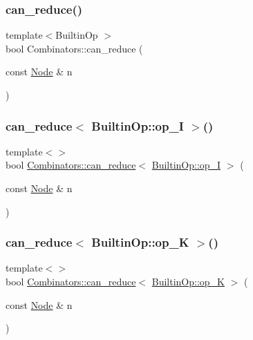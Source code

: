 \subsubsection{\texorpdfstring{can\+\_\+reduce()}{can\_reduce()}}
{\footnotesize\ttfamily template$<$Builtin\+Op $>$ \\
bool Combinators\+::can\+\_\+reduce (\begin{DoxyParamCaption}\item[{const \hyperlink{class_node}{Node} \&}]{n }\end{DoxyParamCaption})}

\mbox{\label{namespace_combinators_ad95b1d79317c4d84eb4f96bac4176fc5}} 
\subsubsection{\texorpdfstring{can\+\_\+reduce$<$ Builtin\+Op\+::op\+\_\+\+I $>$()}{can\_reduce< BuiltinOp::op\_I >()}}
{\footnotesize\ttfamily template$<$$>$ \\
bool \hyperlink{namespace_combinators_aa3c93f1edab6764d54dda56aafac9cd3}{Combinators\+::can\+\_\+reduce}$<$ \hyperlink{_instruction_8h_af2fb7c87c5854c5733d7bb0506b06de7ad44d28cb2a17778a81beb232dd72759a}{Builtin\+Op\+::op\+\_\+I} $>$ (\begin{DoxyParamCaption}\item[{const \hyperlink{class_node}{Node} \&}]{n }\end{DoxyParamCaption})}

\mbox{\label{namespace_combinators_acf147e40e9f56872bedc87bd63705672}} 
\subsubsection{\texorpdfstring{can\+\_\+reduce$<$ Builtin\+Op\+::op\+\_\+\+K $>$()}{can\_reduce< BuiltinOp::op\_K >()}}
{\footnotesize\ttfamily template$<$$>$ \\
bool \hyperlink{namespace_combinators_aa3c93f1edab6764d54dda56aafac9cd3}{Combinators\+::can\+\_\+reduce}$<$ \hyperlink{_instruction_8h_af2fb7c87c5854c5733d7bb0506b06de7a2fb436da7a3a42d51ead8de1ff97583b}{Builtin\+Op\+::op\+\_\+K} $>$ (\begin{DoxyParamCaption}\item[{const \hyperlink{class_node}{Node} \&}]{n }\end{DoxyParamCaption})}

